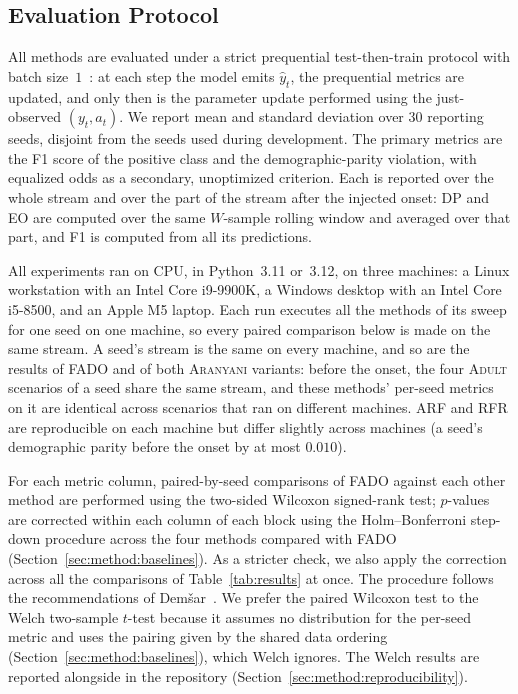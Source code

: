 \documentclass[conference]{IEEEtran}
\newcommand{\fado}{\textsc{FADO}}
\newcommand{\ara}{\textsc{Aranyani}}
\newcommand{\arf}{\textsc{ARF}}
\newcommand{\rfr}{\textsc{RFR}}
\newcommand{\adult}{\textsc{Adult}}
\begin{document}
\subsection{Evaluation Protocol}
\label{sec:method:protocol}
All methods are evaluated under a strict prequential test-then-train protocol with batch size~$1$~\cite{10.1007/s10994-012-5320-9}: at each step the model emits
$\hat{y}_t$, the prequential metrics are updated, and only then is the parameter update 
performed using the just-observed $(y_t, a_t)$. We report mean and
standard deviation over $30$ reporting seeds, disjoint from the 
seeds used during development. The primary metrics are the F1 score of the positive class
and the demographic-parity violation, with equalized odds as a secondary, unoptimized 
criterion. Each is reported over the whole stream and over the part of the stream after the injected onset: DP and EO are
computed over the same $W$-sample rolling window and averaged over that part, and F1 is computed from all its predictions.

All experiments ran on CPU, in Python~3.11 or~3.12, on three machines: a Linux workstation with an Intel Core i9-9900K, a Windows desktop with an Intel
Core i5-8500, and an Apple M5 laptop. Each run executes all the methods of its sweep for one seed on one machine, so every paired comparison
below is made on the same stream. A seed's stream is the same on every machine, and so are the results of \fado{} and of both
\ara{} variants: before the onset, the four \adult{} scenarios of a seed share the same stream, and these methods' per-seed metrics on it are identical across
scenarios that ran on different machines. \arf{} and \rfr{} are reproducible on each machine but differ slightly across machines (a seed's demographic
parity before the onset by at most $0.010$).

For each metric column, paired-by-seed comparisons of \fado{} against each other method are 
performed using the two-sided Wilcoxon signed-rank test; $p$-values are
corrected within each column of each block using the Holm--Bonferroni step-down procedure across the 
four methods compared with \fado{} (Section~\ref{sec:method:baselines}). As a stricter
check, we also apply the correction across all the comparisons of Table~\ref{tab:results} at once. The procedure follows the recommendations of
Dem{\v{s}}ar~\cite{demsar2006statistical}. We prefer the paired Wilcoxon test to the Welch two-sample $t$-test because it assumes no distribution for the
per-seed metric and uses the pairing given by the shared data ordering (Section~\ref{sec:method:baselines}), which Welch ignores. The Welch results are reported
alongside in the repository (Section~\ref{sec:method:reproducibility}).
\end{document}
